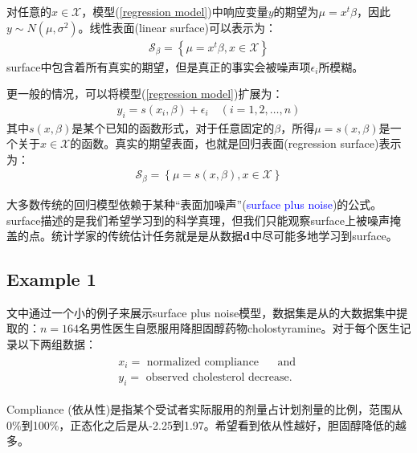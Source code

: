 \documentclass[lang=cn,11pt,a4paper,cite=authoryear]{elegantpaper}
\begin{document}
对任意的$x \in \mathcal{X}$，模型(\ref{regression model})中响应变量$y$的期望为$\mu = x^t \beta$，因此$y \sim N(\mu, \sigma^2)$。线性表面(linear surface)可以表示为：
\begin{align}
\mathcal{S}_{\beta}=\left\{\mu=x^{t} \beta, x \in \mathcal{X}\right\}
\end{align}
surface中包含着所有真实的期望，但是真正的事实会被噪声项$\epsilon_i$所模糊。

更一般的情况，可以将模型(\ref{regression model})扩展为：
\begin{align}
\label{general regression model}
y_{i}=s(x_i, \beta)+\epsilon_{i} \quad(i=1,2, \ldots, n)
\end{align}
其中$s(x, \beta)$是某个已知的函数形式，对于任意固定的$\beta$，所得$\mu = s(x, \beta)$是一个关于$x \in \mathcal{X}$的函数。真实的期望表面，也就是回归表面(regression surface)表示为：
\begin{align}
\mathcal{S}_{\beta}=\left\{\mu=s(x, \beta), x \in \mathcal{X}\right\}
\end{align}

大多数传统的回归模型依赖于某种“表面加噪声”(\textcolor{blue}{surface plus noise})的公式。surface描述的是我们希望学习到的科学真理，但我们只能观察surface上被噪声掩盖的点。统计学家的传统估计任务就是是从数据$\bold{d}$中尽可能多地学习到surface。

\subsection{Example 1}

文中通过一个小的例子来展示surface plus noise模型，数据集是从\cite{efron1991compliance}的大数据集中提取的：$n=164$名男性医生自愿服用降胆固醇药物cholostyramine。对于每个医生记录以下两组数据：
\begin{align}
\begin{array}{l}
x_{i}=\text { normalized compliance } \quad \text { and } \\
y_{i}=\text { observed cholesterol decrease. }
\end{array}
\end{align}

Compliance (依从性)是指某个受试者实际服用的剂量占计划剂量的比例，范围从0\%到100\%，正态化之后是从-2.25到1.97。希望看到依从性越好，胆固醇降低的越多。
\end{document}
